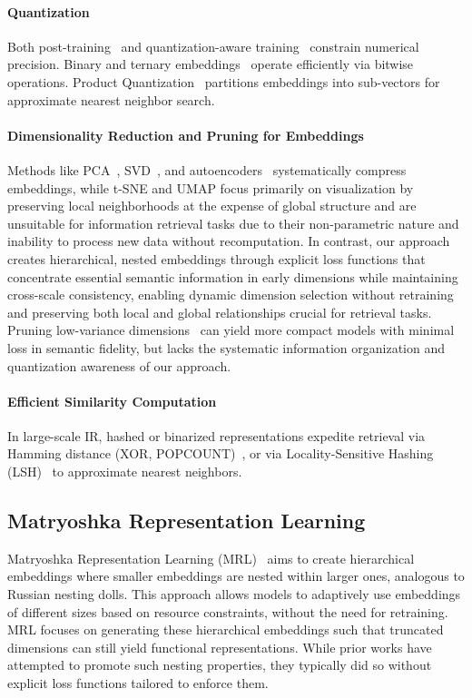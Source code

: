 \paragraph{Quantization}
Both post-training~\cite{jacob2018quantization} and quantization-aware training~\cite{hubara2017quantized,mishra2018apprentice} constrain numerical precision. Binary and ternary embeddings~\cite{shen2018nash, shu2018compressing} operate efficiently via bitwise operations. Product Quantization~\cite{jegou2010product} partitions embeddings into sub-vectors for approximate nearest neighbor search.

\paragraph{Dimensionality Reduction and Pruning for Embeddings}
Methods like PCA~\cite{jolliffe2016principal}, SVD~\cite{golub1971singular}, and autoencoders~\cite{hinton2006reducing} systematically compress embeddings, while t-SNE and UMAP focus primarily on visualization by preserving local neighborhoods at the expense of global structure and are unsuitable for information retrieval tasks due to their non-parametric nature and inability to process new data without recomputation. 
In contrast, our approach creates hierarchical, nested embeddings through explicit loss functions that concentrate essential semantic information in early dimensions while maintaining cross-scale consistency, enabling dynamic dimension selection without retraining and preserving both local and global relationships crucial for retrieval tasks. 
Pruning low-variance dimensions~\cite{li2016pruning} can yield more compact models with minimal loss in semantic fidelity, but lacks the systematic information organization and quantization awareness of our approach.

\paragraph{Efficient Similarity Computation}
In large-scale IR, hashed or binarized representations expedite retrieval via Hamming distance (XOR, POPCOUNT)~\cite{wang2017survey}, or via Locality-Sensitive Hashing (LSH)~\cite{andoni2006near} to approximate nearest neighbors.

\subsection{Matryoshka Representation Learning}
Matryoshka Representation Learning (MRL)~\cite{kusupati2021matryoshka} aims to create hierarchical embeddings where smaller embeddings are nested within larger ones, analogous to Russian nesting dolls. This approach allows models to adaptively use embeddings of different sizes based on resource constraints, without the need for retraining. MRL focuses on generating these hierarchical embeddings such that truncated dimensions can still yield functional representations. While prior works have attempted to promote such nesting properties, they typically did so without explicit loss functions tailored to enforce them.

